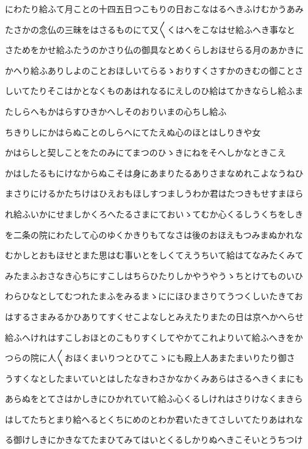 \documentclass[a4paper,11pt,landscape]{ltjtarticle}
\begin{document}
にわたり給ふて月ことの十四五日つこもりの日おこなはるへきふけむかうあみ
\par\medskip
たさかの念仏の三昧をはさるものにて又〱くはへをこなはせ給ふへき事なと
\par\medskip
さためをかせ給ふたうのかさり仏の御具なとめくらしおほせらる月のあかきに
\par\medskip
かへり給ふありしよのことおほしいてらるゝおりすくさすかのきむの御ことさ
\par\medskip
しいてたりそこはかとなくものあはれなるにえしのひ給はてかきならし給ふま
\par\medskip
たしらへもかはらすひきかへしそのおりいまの心ちし給ふ
\par\medskip
ちきりしにかはらぬことのしらへにてたえぬ心のほとはしりきや女
\par\medskip
かはらしと契しことをたのみにてまつのひゝきにねをそへしかなときこえ
\par\medskip
かはしたるもにけなからぬこそは身にあまりたるありさまなめれこよなうねひ
\par\medskip
まさりにけるかたちけはひえおもほしすつましうわか君はたつきもせすまほら
\par\medskip
れ給ふいかにせましかくろへたるさまにておいゝてむか心くるしうくちをしき
\par\medskip
を二条の院にわたして心のゆくかきりもてなさは後のおほえもつみまぬかれな
\par\medskip
むかしとおもほせとまた思はむ事いとをしくてえうちいて給はてなみたくみて
\par\medskip
みたまふおさなき心ちにすこしはちらひたりしかやうやうゝちとけてものいひ
\par\medskip
わらひなとしてむつれたまふをみるまゝににほひまさりてうつくしいたきてお
\par\medskip
はするさまみるかひありてすくせこよなしとみえたりまたの日は京へかへらせ
\par\medskip
給ふへけれはすこしおほとのこもりすくしてやかてこれよりいて給ふへきをか
\par\medskip
つらの院に人〱おほくまいりつとひてこゝにも殿上人あまたまいりたり御さ
\par\medskip
うすくなとしたまいていとはしたなきわさかなかくみあらはさるへきくまにも
\par\medskip
あらぬをとてさはかしきにひかれていて給ふ心くるしけれはさりけなくまきら
\par\medskip
はしてたちとまり給へるとくちにめのとわか君いたきてさしいてたりあはれな
\par\medskip
る御けしきにかきなてたまひてみてはいとくるしかりぬへきこそいとうちつけ
\end{document}
